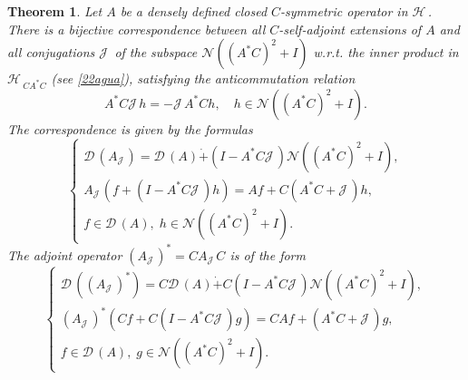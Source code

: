 \documentclass[12pt]{amsart}
\newtheorem{thm}{Theorem}
\theoremstyle{definition}
\newcommand{\cJ}{\mathcal{J}\,}
\newcommand{\cD}{\mathcal{D}\,}
\newcommand{\cH}{\mathcal{H}\,}
\newcommand{\cN}{\mathcal{N}}
\begin{document}
\begin{thm}\label{gua30a}
Let $A$ be a densely defined closed $C$-symmetric operator in $\cH$. There is a bijective correspondence between all $C$-self-adjoint extensions of $A$ and all conjugations $\cJ$ of the subspace $\cN((A^*C)^2+I)$ w.r.t. the inner product in $\cH_{CA^*C}$ (see \eqref{22agua}), satisfying the anticommutation relation
\begin{equation}\label{30aagua}
A^*C\cJ h=-\cJ A^*Ch, \quad h\in \cN((A^*C)^2+I).
\end{equation}
 The correspondence is given by the formulas
 \begin{equation}\label{21abgua}
\left\{\begin{array}{l}  \cD(A_{\cJ})=\cD(A)\dot+(I-A^*C \cJ)\cN((A^*C)^2+I),\\[2mm]
A_{\cJ} (f+(I-A^*C \cJ)h)=Af+C(A^*C+\cJ)h,\\[2mm]
 f\in\cD(A),\; h\in\cN( (A^*C)^2+I).
\end{array}\right.
  \end{equation}
  The adjoint operator $(A_{\cJ})^*=CA_\cJ C$ is of the form
\begin{equation}\label{21bcgua}
\left\{ \begin{array}{l}
\cD((A_\cJ)^*)=C\cD(A)\dot+C(I-A^*C\cJ)\cN((A^*C)^2+I),\\[2mm] %
(A_\cJ)^*(Cf+C(I-A^*C\cJ)g)=CAf+(A^*C+\cJ)g,\\[2mm]
f\in\cD(A),\; g\in\cN( (A^*C)^2+I).
\end{array}\right.
\end{equation}

\end{thm}
\end{document}
